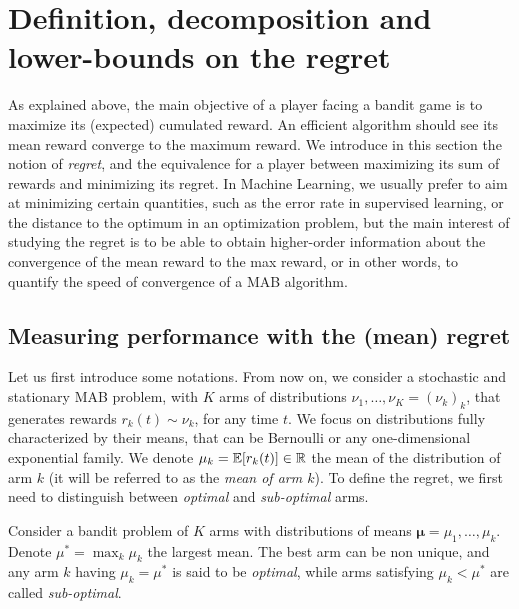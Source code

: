 

\section{Definition, decomposition and lower-bounds on the regret}
\label{sec:2:lowerUpperBoundsRegret}

As explained above, the main objective of a player facing a bandit game is to maximize its (expected) cumulated reward.
An efficient algorithm should see its mean reward converge to the maximum reward.
We introduce in this section the notion of \emph{regret}, and the equivalence for a player between maximizing its sum of rewards and minimizing its regret.
In Machine Learning, we usually prefer to aim at minimizing certain quantities, such as the error rate in supervised learning, or the distance to the optimum in an optimization problem,
but the main interest of studying the regret is to be able to obtain higher-order information about the convergence of the mean reward to the max reward,
or in other words, to quantify the speed of convergence of a MAB algorithm.


\subsection{Measuring performance with the (mean) regret}

Let us first introduce some notations.
From now on, we consider a stochastic and stationary MAB problem, with $K$ arms of distributions $\nu_1,\dots,\nu_K=(\nu_k)_k$, that generates \iid{} rewards $r_k(t)\sim \nu_k$, for any time $t$.
We focus on distributions fully characterized by their means, that can be Bernoulli or any one-dimensional exponential family.
We denote $\mu_k = \mathbb{E}[r_k(t)] \in \mathbb{R}$ the mean of the distribution of arm $k$ (it will be referred to as the \emph{mean of arm $k$}).
%
%
To define the regret, we first need to distinguish between \emph{optimal} and \emph{sub-optimal} arms.

\begin{defn}\label{def:2:optimalSubOptimalArms}
    Consider a bandit problem of $K$ arms with distributions of means $\bm{\mu}=\mu_1,\dots,\mu_k$.
    Denote $\mu^* = \max_k \mu_k$ the largest mean.
    The best arm can be non unique, and any arm $k$ having $\mu_k = \mu^*$ is said to be \emph{optimal},
    while arms satisfying $\mu_k < \mu^*$ are called \emph{sub-optimal}.
\end{defn}

